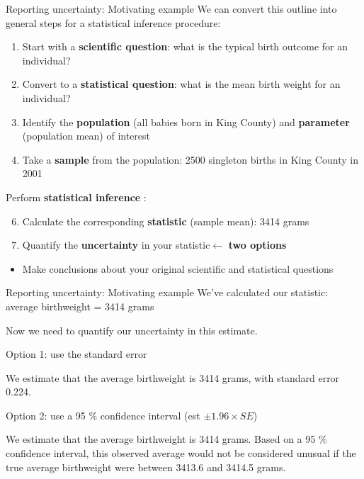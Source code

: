 \documentclass[
  ignorenonframetext,
]{beamer}
\providecommand{\tightlist}{%
  \setlength{\itemsep}{0pt}\setlength{\parskip}{0pt}}
\begin{document}
\begin{frame}{Reporting uncertainty: Motivating example}
\protect\hypertarget{reporting-uncertainty-motivating-example-1}{}
We can convert this outline into general steps for a statistical
inference procedure:

\begin{enumerate}
\item
  Start with a \textbf{scientific question}: what is the typical birth
  outcome for an individual?
\item
  Convert to a \textbf{statistical question}: what is the mean birth
  weight for an individual?
\item
  Identify the \textbf{population} (all babies born in King County) and
  \textbf{parameter} (population mean) of interest
\item
  Take a \textbf{sample} from the population: 2500 singleton births in
  King County in 2001
\end{enumerate}

Perform \textbf{statistical inference} :

\begin{enumerate}
\setcounter{enumi}{5}
\tightlist
\item
  Calculate the corresponding \textbf{statistic} (sample mean): 3414
  grams
\item
  Quantify the \textbf{uncertainty} in your statistic\(\leftarrow\)
  \textbf{two options}
\end{enumerate}

\begin{itemize}
\tightlist
\item
  Make conclusions about your original scientific and statistical
  questions
\end{itemize}
\end{frame}

\begin{frame}{Reporting uncertainty: Motivating example}
\protect\hypertarget{reporting-uncertainty-motivating-example-2}{}
We've calculated our statistic: average birthweight = 3414 grams

Now we need to quantify our uncertainty in this estimate.

{Option 1}: use the standard error

We estimate that the average birthweight is 3414 grams, with standard
error 0.224.

{Option 2}: use a 95 \% confidence interval (est \(\pm 1.96 \times SE\))

We estimate that the average birthweight is 3414 grams. Based on a 95 \%
confidence interval, this observed average would not be considered
unusual if the true average birthweight were between 3413.6 and 3414.5
grams.
\end{frame}
\end{document}
